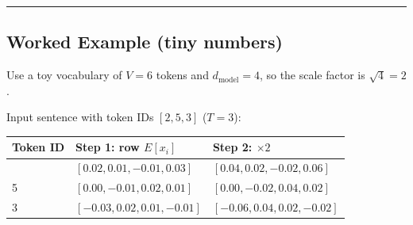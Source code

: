 \documentclass[11pt,a4paper,oneside]{report}
\begin{document}
\begin{center}\rule{0.5\linewidth}{0.5pt}\end{center}

\subsection{Worked Example (tiny numbers)}\label{worked-example-tiny-numbers}

Use a toy vocabulary of \(V = 6\) tokens and \(d_{\text{model}} = 4\), so the scale factor is \(\sqrt{4} = 2\).

\begin{center}\end{center}

Input sentence with token IDs \([2, 5, 3]\) (\(T = 3\)):

{\def\LTcaptype{none} %
\begin{longtable}[]{@{}lll@{}}
\toprule\noalign{}
Token ID & Step 1: row \(E[x_i]\) & Step 2: \(\times 2\) \\
\midrule\noalign{}
\endhead
\bottomrule\noalign{}
\endlastfoot
2 & \([0.02,\allowbreak 0.01,\allowbreak -0.01,\allowbreak 0.03]\) & \([0.04,\allowbreak 0.02,\allowbreak -0.02,\allowbreak 0.06]\) \\
5 & \([0.00,\allowbreak -0.01,\allowbreak 0.02,\allowbreak 0.01]\) & \([0.00,\allowbreak -0.02,\allowbreak 0.04,\allowbreak 0.02]\) \\
3 & \([-0.03,\allowbreak 0.02,\allowbreak 0.01,\allowbreak -0.01]\) & \([-0.06,\allowbreak 0.04,\allowbreak 0.02,\allowbreak -0.02]\) \\
\end{longtable}
}
\end{document}
